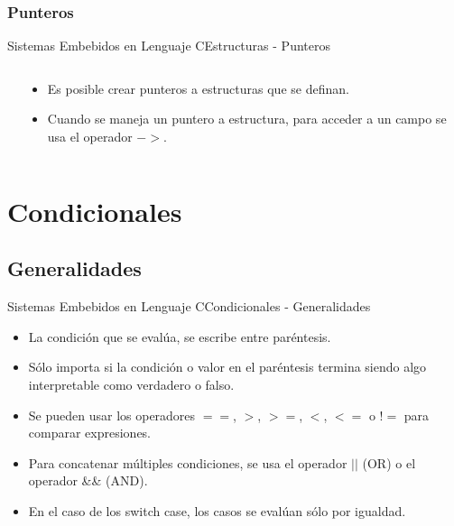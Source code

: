 \documentclass[aspectratio=169, xcolor=dvipsnames]{beamer}
\begin{document}
\subsubsection{Punteros}
\begin{frame}{Sistemas Embebidos en Lenguaje C}{Estructuras - Punteros}
\begin{columns}
    \begin{column}{0.5\textwidth}
        
    \end{column}
    \begin{column}{0.5\textwidth}
        \begin{itemize}
            \item Es posible crear punteros a estructuras que se definan.
            \item Cuando se maneja un puntero a estructura, para acceder a un campo se usa el operador \textbf{$->$}.
        \end{itemize}
    \end{column}
\end{columns}
\end{frame}

\section{Condicionales}
\subsection{Generalidades}
\begin{frame}{Sistemas Embebidos en Lenguaje C}{Condicionales - Generalidades}
\begin{itemize}
    \item La condición que se evalúa, se escribe entre paréntesis.
    \item Sólo importa si la condición o valor en el paréntesis termina siendo algo interpretable como verdadero o falso.
    \item Se pueden usar los operadores \textbf{$==$}, \textbf{$>$}, \textbf{$>=$}, \textbf{$<$}, \textbf{$<=$} o \textbf{$!=$} para comparar expresiones.
    \item Para concatenar múltiples condiciones, se usa el operador $||$ (OR) o el operador \&\& (AND).
    \item En el caso de los switch case, los casos se evalúan sólo por igualdad.
\end{itemize}
\end{frame}
\end{document}
